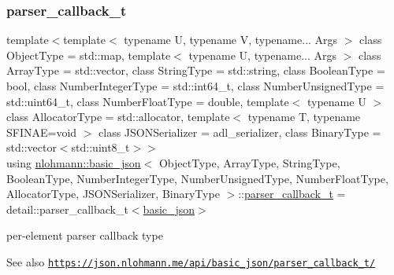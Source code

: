 \subsubsection{\texorpdfstring{parser\+\_\+callback\+\_\+t}{parser\_callback\_t}}
{\footnotesize\ttfamily template$<$template$<$ typename U, typename V, typename... Args $>$ class Object\+Type = std\+::map, template$<$ typename U, typename... Args $>$ class Array\+Type = std\+::vector, class String\+Type  = std\+::string, class Boolean\+Type  = bool, class Number\+Integer\+Type  = std\+::int64\+\_\+t, class Number\+Unsigned\+Type  = std\+::uint64\+\_\+t, class Number\+Float\+Type  = double, template$<$ typename U $>$ class Allocator\+Type = std\+::allocator, template$<$ typename T, typename S\+F\+I\+N\+A\+E=void $>$ class J\+S\+O\+N\+Serializer = adl\+\_\+serializer, class Binary\+Type  = std\+::vector$<$std\+::uint8\+\_\+t$>$$>$ \\
using \hyperlink{classnlohmann_1_1basic__json}{nlohmann\+::basic\+\_\+json}$<$ Object\+Type, Array\+Type, String\+Type, Boolean\+Type, Number\+Integer\+Type, Number\+Unsigned\+Type, Number\+Float\+Type, Allocator\+Type, J\+S\+O\+N\+Serializer, Binary\+Type $>$\+::\hyperlink{classnlohmann_1_1basic__json_a0273d074462644e5d5a7ff313ad0d742}{parser\+\_\+callback\+\_\+t} =  detail\+::parser\+\_\+callback\+\_\+t$<$\hyperlink{classnlohmann_1_1basic__json}{basic\+\_\+json}$>$}



per-\/element parser callback type 

\begin{DoxySeeAlso}{See also}
\href{https://json.nlohmann.me/api/basic_json/parser_callback_t/}{\tt https\+://json.\+nlohmann.\+me/api/basic\+\_\+json/parser\+\_\+callback\+\_\+t/} 
\end{DoxySeeAlso}
\mbox{\label{classnlohmann_1_1basic__json_a33593865ffb1860323dcbd52425b90c8}} 

